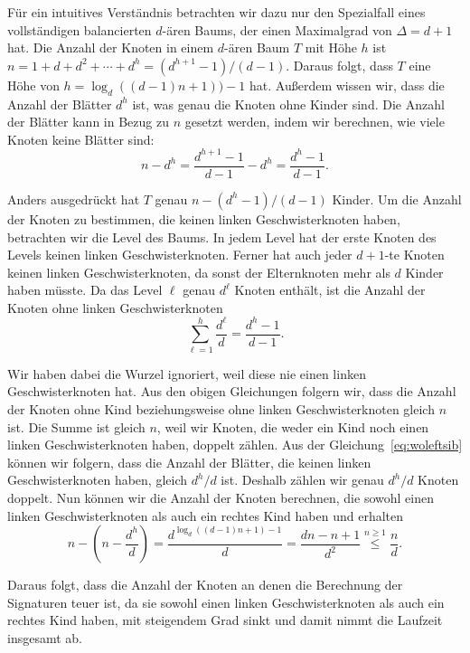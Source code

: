 Für ein intuitives Verständnis betrachten wir dazu nur den Spezialfall eines vollständigen balancierten $d$\hyp ären Baums, der einen Maximalgrad von $\Delta = d + 1$ hat.
Die Anzahl der Knoten in einem $d$\hyp ären Baum $T$ mit Höhe $h$ ist $n = 1 + d + d^2 + \cdots + d^h = (d^{h+1} - 1)/(d - 1)$.
Daraus folgt, dass $T$ eine Höhe von $h = \log_d((d-1)n+1))-1$ hat.
Außerdem wissen wir, dass die Anzahl der Blätter $d^h$ ist, was genau die Knoten ohne Kinder sind.
Die Anzahl der Blätter kann in Bezug zu $n$ gesetzt werden, indem wir berechnen, wie viele Knoten keine Blätter sind:
\begin{equation*}
    n - d^h = \frac{d^{h+1} - 1}{d - 1}  - d^h = \frac{d^h - 1}{d - 1}.
\end{equation*}

Anders ausgedrückt hat $T$ genau $n - (d^h - 1)/(d - 1)$ Kinder.
Um die Anzahl der Knoten zu bestimmen, die keinen linken Geschwisterknoten haben, betrachten wir die Level des Baums.
In jedem Level hat der erste Knoten des Levels keinen linken Geschwisterknoten.
Ferner hat auch jeder $d+1$\hyp te Knoten keinen linken Geschwisterknoten, da sonst der Elternknoten mehr als $d$ Kinder haben müsste.
Da das Level $\ell$ genau $d^{\ell}$ Knoten enthält, ist die Anzahl der Knoten ohne linken Geschwisterknoten
\begin{equation}\label{eq:woleftsib}
    \sum_{\ell=1}^{h} \frac{d^\ell}{d} = \frac{d^h - 1}{d - 1}.
\end{equation}

Wir haben dabei die Wurzel ignoriert, weil diese nie einen linken Geschwisterknoten hat.
Aus den obigen Gleichungen folgern wir, dass die Anzahl der Knoten ohne Kind beziehungsweise ohne linken Geschwisterknoten gleich $n$ ist.
Die Summe ist gleich $n$, weil wir Knoten, die weder ein Kind noch einen linken Geschwisterknoten haben, doppelt zählen.
Aus der Gleichung~\eqref{eq:woleftsib} können wir folgern, dass die Anzahl der Blätter, die keinen linken Geschwisterknoten haben, gleich $d^h / d$ ist.
Deshalb zählen wir genau $d^h / d$ Knoten doppelt.
Nun können wir die Anzahl der Knoten berechnen, die sowohl einen linken Geschwisterknoten als auch ein rechtes Kind haben und erhalten
\begin{equation*}
    n - \left(n - \frac{d^h}{d}\right) = \frac{d^{\log_d((d-1)n + 1) - 1}}{d} = \frac{dn - n + 1}{d^2} \overset{n \geq 1}{\leq} \frac{n}{d}.
\end{equation*}

Daraus folgt, dass die Anzahl der Knoten an denen die Berechnung der Signaturen teuer ist, da sie sowohl einen linken Geschwisterknoten als auch ein rechtes Kind haben, mit steigendem Grad sinkt und damit nimmt die Laufzeit insgesamt ab.



